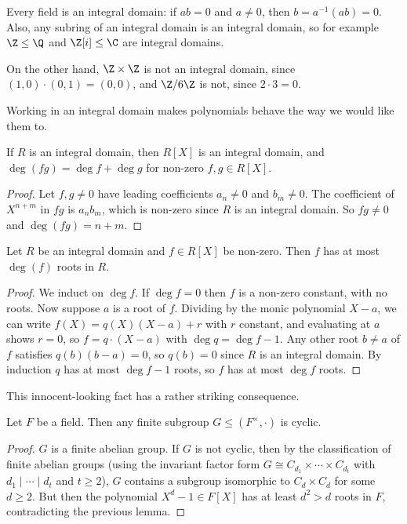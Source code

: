 \begin{example}
	Every field is an integral domain: if $ab = 0$ and $a \neq 0$, then $b = a^{-1}(ab) = 0$. Also, any subring of an integral domain is an integral domain, so for example $\Z \leq \Q$ and $\Z[i] \leq \C$ are integral domains.

	On the other hand, $\Z \times \Z$ is not an integral domain, since $(1, 0)\cdot(0, 1) = (0,0)$, and $\Z/6\Z$ is not, since $2 \cdot 3 = 0$.
\end{example}

Working in an integral domain makes polynomials behave the way we would like them to.

\begin{lemma}
	If $R$ is an integral domain, then $R[X]$ is an integral domain, and $\deg(fg) = \deg f + \deg g$ for non-zero $f, g \in R[X]$.
\end{lemma}
\begin{proof}
	Let $f, g \neq 0$ have leading coefficients $a_n \neq 0$ and $b_m \neq 0$. The coefficient of $X^{n + m}$ in $fg$ is $a_n b_m$, which is non-zero since $R$ is an integral domain. So $fg \neq 0$ and $\deg(fg) = n + m$.
\end{proof}

\begin{lemma}
	Let $R$ be an integral domain and $f \in R[X]$ be non-zero. Then $f$ has at most $\deg (f)$ roots in $R$.
\end{lemma}
\begin{proof}
	We induct on $\deg f$. If $\deg f = 0$ then $f$ is a non-zero constant, with no roots. Now suppose $a$ is a root of $f$. Dividing by the monic polynomial $X - a$, we can write $f(X) = q(X)(X - a) + r$ with $r$ constant, and evaluating at $a$ shows $r = 0$, so $f = q \cdot (X - a)$ with $\deg q = \deg f - 1$. Any other root $b \neq a$ of $f$ satisfies $q(b)(b - a) = 0$, so $q(b) = 0$ since $R$ is an integral domain. By induction $q$ has at most $\deg f - 1$ roots, so $f$ has at most $\deg f$ roots.
\end{proof}

This innocent-looking fact has a rather striking consequence.

\begin{theorem}
	Let $F$ be a field. Then any finite subgroup $G \leq (F^{\times}, \cdot)$ is cyclic.
\end{theorem}
\begin{proof}
	$G$ is a finite abelian group. If $G$ is not cyclic, then by the classification of finite abelian groups (using the invariant factor form $G \cong C_{d_1} \times \cdots \times C_{d_t}$ with $d_1 \mid \cdots \mid d_t$ and $t \geq 2$), $G$ contains a subgroup isomorphic to $C_d \times C_d$ for some $d \geq 2$. But then the polynomial $X^d - 1 \in F[X]$ has at least $d^2 > d$ roots in $F$, contradicting the previous lemma.
\end{proof}

